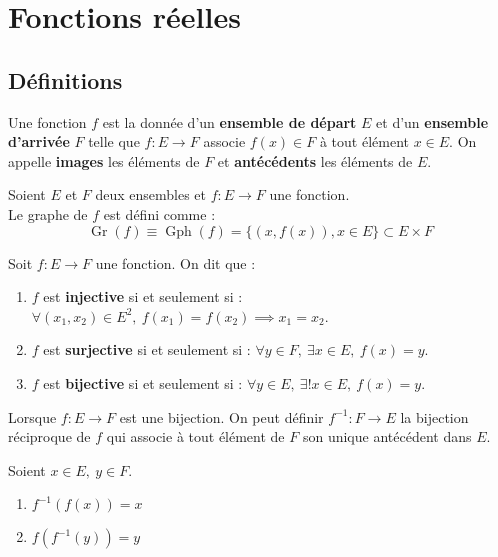 \chapter{Fonctions réelles}

\section{Définitions}
\begin{definition}[Fonction]
	Une fonction $f$ est la donnée d'un \textbf{ensemble de départ} $E$ et d'un \textbf{ensemble d'arrivée} $F$ telle que 
	$ f : E \to F $
	associe $f(x) \in F$ à tout élément $x \in E$.
	On appelle \textbf{images} les éléments de $F$ et \textbf{antécédents} les éléments de $E$.
\end{definition}

\begin{definition}
	Soient $E$ et $F$ deux ensembles et $f : E \to F$ une fonction.
	\\
	Le graphe de $f$ est défini comme :
	\[ \operatorname{Gr}(f) \equiv \operatorname{Gph}(f) = \{ (x, f(x)), x \in E \} \subset E \times F \] 
\end{definition}

\begin{definition}
	Soit $f : E \to F$ une fonction. On dit que :
    \begin{enumerate}
        \item $f$ est \textbf{injective} si et seulement si : $\forall (x_1, x_2) \in E^2,\ f(x_1) = f(x_2) \implies x_1 = x_2$.
        \item $f$ est \textbf{surjective} si et seulement si : $\forall y \in F,\ \exists x \in E,\ f(x) = y$.
        \item $f$ est \textbf{bijective} si et seulement si : $\forall y \in E,\ \exists ! x \in E,\ f(x) = y$.
    \end{enumerate}
\end{definition}

\begin{definition}
	Lorsque $f : E \to F$ est une bijection. On peut définir $f^{-1} : F \to E$ la bijection réciproque de $f$ qui associe à tout élément de $F$ son unique antécédent dans $E$.
\end{definition}

\begin{proposition}
	Soient $x \in E,\ y \in F$.
    \begin{multicols}{2}
        \begin{enumerate}
            \item $f^{-1} (f(x)) = x$
            \item $f(f^{-1}(y)) = y$
        \end{enumerate}
    \end{multicols}
\end{proposition}

